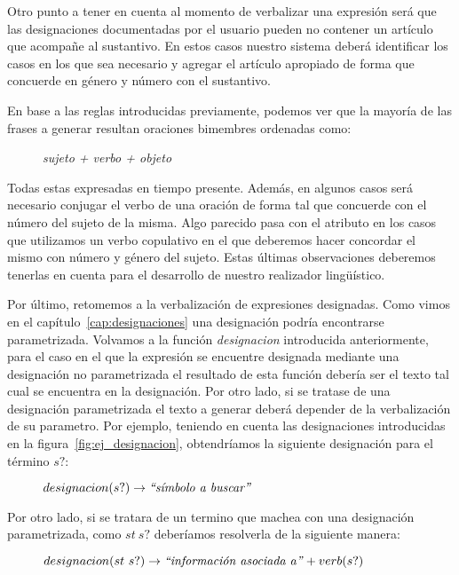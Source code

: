 Otro punto a tener en cuenta al momento de verbalizar una expresión será que las designaciones documentadas por el usuario pueden no contener un artículo que acompañe al sustantivo. En estos casos nuestro sistema deberá identificar los casos en los que sea necesario y agregar el artículo apropiado de forma que concuerde en género y número con el sustantivo. 

En base a las reglas introducidas previamente, podemos ver que la mayoría de las frases a generar resultan oraciones bimembres ordenadas como: 
\begin{figure}[H]
\center
\emph{sujeto + verbo + objeto}
\end{figure}

\noindent
Todas estas expresadas en tiempo presente. Además, en algunos casos será necesario conjugar el verbo de una oración de forma tal que concuerde con el número del sujeto de la misma. Algo parecido pasa con el atributo en los casos que utilizamos un verbo copulativo en el que deberemos hacer concordar el mismo con número y género del sujeto. Estas últimas observaciones deberemos tenerlas en cuenta para el desarrollo de nuestro realizador lingüístico.

Por último, retomemos a la verbalización de expresiones designadas. Como vimos en el capítulo~\ref{cap:designaciones} una designación podría encontrarse parametrizada. Volvamos a la función \emph{designacion} introducida anteriormente, para el caso en el que la expresión se encuentre designada mediante una designación no parametrizada el resultado de esta función debería ser el texto tal cual se encuentra en la designación. Por otro lado, si se tratase de una designación parametrizada el texto a generar deberá depender de la verbalización de su parametro. Por ejemplo, teniendo en cuenta las designaciones introducidas en la figura~\ref{fig:ej_designacion}, obtendríamos la siguiente designación para el término $s?$:

\begin{figure}[H]
\center
$designacion(s?) \rightarrow \text{\emph{``símbolo a buscar''}}$
\end{figure}

\noindent
Por otro lado, si se tratara de un termino que machea con una designación parametrizada, como $st~s?$ deberíamos resolverla de la siguiente manera: 

\begin{figure}[H]
\center
$designacion(st~s?) \rightarrow \text{\emph{``información asociada a''}} + verb(s?)$
\end{figure}



